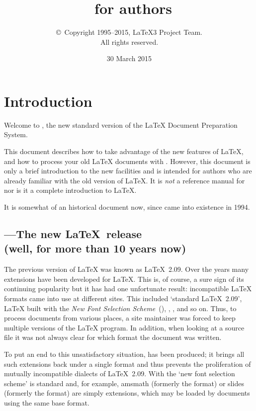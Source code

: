 \documentclass{ltxguide}[2001/05/28]
\title{\LaTeXe~for authors}
\author{\copyright~Copyright 1995--2015, \LaTeX3 Project Team.\\
   All rights reserved.}
\date{30 March 2015}
\begin{document}
\maketitle

\tableofcontents

\section{Introduction}

Welcome to \LaTeXe, the new standard version of the \LaTeX{} Document
Preparation System.

This document describes how to take advantage of the new features of
\LaTeX, and how to process your old \LaTeX{} documents with
\LaTeXe. However, this document is only a brief introduction to the
new facilities and is intended for authors who are already familiar
with the old version of \LaTeX{}.  It is \emph{not} a reference manual
for \LaTeXe{} nor is it a complete introduction to \LaTeX.

It is somewhat of an historical document now, since \LaTeXe{} came into
existence in 1994.

\subsection[\LaTeXe---The new \LaTeX~release]
  {\LaTeXe---The new \LaTeX~release\\ (well, for more than 10 years now)}

The previous version of \LaTeX{} was known as \LaTeX~2.09.  Over the
years many extensions have been developed for \LaTeX.  This is, of
course, a sure sign of its continuing popularity but it has had one
unfortunate result: incompatible \LaTeX{} formats came into use at
different sites.  This included `standard \LaTeX~2.09', \LaTeX{} built
with the \emph{New Font Selection Scheme}~(\NFSS), \SLiTeX, \AmSLaTeX,
and so on.  Thus, to process documents from various places, a site
maintainer was forced to keep multiple versions of the \LaTeX{}
program.  In addition, when looking at a source file it was not always
clear for which format the document was written.

To put an end to this unsatisfactory situation, \LaTeXe{} has been
produced; it brings all such extensions back under a single format and
thus prevents the proliferation of mutually incompatible dialects of
\LaTeX~2.09.  With \LaTeXe{} the `new font selection scheme' is
standard and, for example, \textsf{amsmath} (formerly the \AmSLaTeX{}
format) or \textsf{slides} (formerly the \SLiTeX{} format) are simply
extensions, which may be loaded by documents using the same base format.
\end{document}
